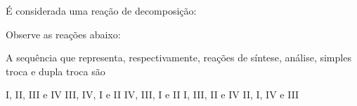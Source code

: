 \documentclass[a4paper,12]{exam}
\begin{document}
\begin{multicols}{2}
\begin{questions}
				É considerada uma reação de decomposição: \\
				\begin{oneparchoices}

				\end{oneparchoices}

\question[10]{}Observe as reações abaixo:
{
  \renewcommand*\thechoice{\Roman{choice}}
  \renewcommand*\choicelabel{\thechoice.}
  \begin{choices}
\choice{} 
\choice{} 
\choice{} 
\choice{} 
\end{choices}
}
A sequência que representa, respectivamente, reações de síntese,
análise, simples troca e dupla troca são
{
  \renewcommand*\thechoice{\alph{choice}}
  \renewcommand*\choicelabel{(\thechoice)}

\begin{choices}
\choice{} I, II, III e IV
\choice{} III, IV, I e II
\choice{} IV, III, I e II
\choice{} I, III, II e IV
\choice{} II, I, IV e III
\end{choices}
}
			\end{questions}
			
\end{multicols}
\end{document}
